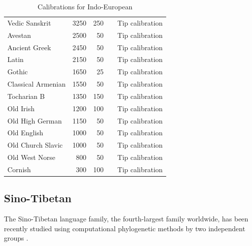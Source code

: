 \documentclass[]{rsos}%
\begin{document}
\begin{table}
\begin{tabular}{p{7cm}rrcl}
    Vedic Sanskrit & 3250 & 250 & \parencite{chang2015ancestryconstrained} & Tip calibration \\
    Avestan & 2500 & 50 & \parencite{chang2015ancestryconstrained} & Tip calibration \\
    Ancient Greek & 2450 & 50 & \parencite{chang2015ancestryconstrained} & Tip calibration \\
    Latin & 2150 & 50 & \parencite{chang2015ancestryconstrained} & Tip calibration \\
    Gothic & 1650 & 25 & \parencite{chang2015ancestryconstrained} & Tip calibration \\
    Classical Armenian & 1550 & 50 & \parencite{chang2015ancestryconstrained} & Tip calibration \\
    Tocharian B & 1350 & 150 & \parencite{chang2015ancestryconstrained} & Tip calibration \\
    Old Irish & 1200 & 100 & \parencite{chang2015ancestryconstrained} & Tip calibration \\
    Old High German & 1150 & 50 & \parencite{chang2015ancestryconstrained} & Tip calibration \\
    Old English & 1000 & 50 & \parencite{chang2015ancestryconstrained} & Tip calibration \\
    Old Church Slavic & 1000 & 50 & \parencite{chang2015ancestryconstrained} & Tip calibration \\
    Old West Norse & 800 & 50 & \parencite{chang2015ancestryconstrained} & Tip calibration \\
    Cornish & 300 & 100 & \parencite{chang2015ancestryconstrained} & Tip calibration
  \end{tabular}
  \caption{Calibrations for Indo-European}
  \label{t:indoeuropean}
\end{table}


\subsection{Sino-Tibetan}\label{s:sinotibetan}
The Sino-Tibetan language family, the fourth-largest family worldwide, has been recently studied using computational phylogenetic methods by two independent groups
\parencite{sagart2019dated,zhang2019phylogenetic}.
\end{document}
